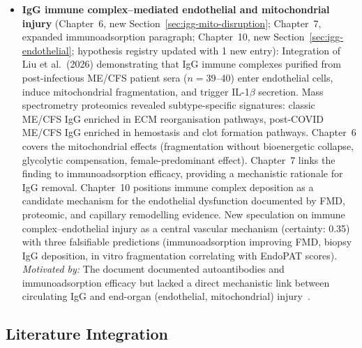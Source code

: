 \begin{itemize}
    \textit{Motivated by:} Document gap identified during clinical dosing review
    --- existing MCAS treatment sections used standard allergy doses without
    reflecting the fourfold up-dosing recommendation from the
    EAACI/GA\textsuperscript{2}LEN urticaria guideline or MCAS specialist
    protocols~\cite{Zuberbier2022urticaria,Afrin2013MCAS,%
    Molderings2016pharmacological,Podder2023updosing,%
    VandenElzen2017updosing,Salvucci2023antihistamineLongCOVID,%
    Nurmatov2015H1systematic,Magerl2015rupatadine,Izquierdo2024rupatadine}.

  \item \textbf{IgG immune complex--mediated endothelial and mitochondrial injury}
    (Chapter~6, new Section~\ref{sec:igg-mito-disruption}; Chapter~7, expanded
    immunoadsorption paragraph; Chapter~10, new
    Section~\ref{sec:igg-endothelial}; hypothesis registry updated with 1 new
    entry):
    Integration of Liu et al.\ (2026) demonstrating that IgG immune complexes
    purified from post-infectious ME/CFS patient sera ($n = 39$--40) enter
    endothelial cells, induce mitochondrial fragmentation, and trigger
    IL-1$\beta$ secretion. Mass spectrometry proteomics revealed
    subtype-specific signatures: classic ME/CFS IgG enriched in ECM
    reorganisation pathways, post-COVID ME/CFS IgG enriched in hemostasis and
    clot formation pathways. Chapter~6 covers the mitochondrial effects
    (fragmentation without bioenergetic collapse, glycolytic compensation,
    female-predominant effect). Chapter~7 links the finding to immunoadsorption
    efficacy, providing a mechanistic rationale for IgG removal. Chapter~10
    positions immune complex deposition as a candidate mechanism for the
    endothelial dysfunction documented by FMD, proteomic, and capillary
    remodelling evidence. New speculation on immune complex--endothelial injury
    as a central vascular mechanism (certainty: 0.35) with three falsifiable
    predictions (immunoadsorption improving FMD, biopsy IgG deposition, in
    vitro fragmentation correlating with EndoPAT scores).
    \textit{Motivated by:} The document documented autoantibodies and
    immunoadsorption efficacy but lacked a direct mechanistic link between
    circulating IgG and end-organ (endothelial, mitochondrial)
    injury~\cite{Liu2026IgGcomplexes}.

\end{itemize}

\subsection*{Literature Integration}

